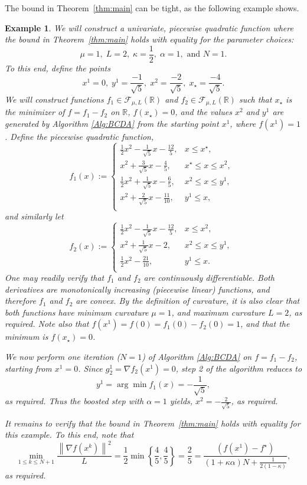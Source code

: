 \documentclass{article} %
\newtheorem{example}{Example}
\newcommand{\R}{{\mathbb R}}
\renewcommand{\leq}{\leqslant}
\begin{document}
{ 
The bound in Theorem~\ref{thm:main} can be tight, as the following example shows.

\begin{example}
\label{ex:tight}
    We will construct a univariate, piecewise quadratic function where the bound in Theorem~\ref{thm:main} holds with equality for the parameter choices:
\[
\mu = 1, \; L = 2, \; \kappa = \frac{1}{2}, \; \alpha = 1, \mbox{ and } N = 1.
\]
To this end, define the points
\[
x^1 = 0, \; y^1 = \frac{-1}{\sqrt{5}}, \;
x^2 = \frac{-2}{\sqrt{5}}, \; x_\star  =\frac{-4}{\sqrt{5}}. 
\]
We will construct functions $f_1 \in\mathcal{F}_{\mu, L}({\mathbb{R}})$ and $f_2 \in \mathcal{F}_{\mu, L}({\mathbb{R}})$ such that $x_\star$ is the minimizer of $f = f_1 - f_2$ on $\R$, $f(x_\star) = 0$, and the values $x^2$ and $y^1$ are generated by Algorithm \ref{Alg:BCDA} from the starting point $x^1$, where $f(x^1) = 1$. 
Define the piecewise quadratic function,
\[
f_1(x):=
\begin{cases}
\frac{1}{2}x^2 - \frac{1}{\sqrt{5}}x - \frac{12}{5}, & x\le x^\star,\\[1mm]
x^2 + \frac{3}{\sqrt{5}}x - \frac{4}{5}, & x^\star\le x\le x^{2},\\[1mm]
\frac{1}{2}x^2 + \frac{1}{\sqrt{5}}x - \frac{6}{5}, & x^{2}\le x\le y^1,\ \ \\[1mm]
x^2 + \frac{2}{\sqrt{5}}x - \frac{11}{10}, & y^1\le x,\ \ \\
\end{cases}
\]
and similarly let
\[
f_2(x):=
\begin{cases}
\frac{1}{2}x^2 - \frac{1}{\sqrt{5}}x - \frac{12}{5}, &  x\le x^{2},\\[1mm]
x^2 + \frac{1}{\sqrt{5}}x - 2, & x^{2}\le x\le y^1,\ \ \\[1mm]
\frac{1}{2}x^2  - \frac{21}{10}, & y^1\le x.\ \ \\
\end{cases}
\]
One may readily verify that $f_1$ and $f_2$ are continuously differentiable. Both derivatives are monotonically increasing (piecewise linear) functions, and therefore $f_1$ and $f_2$ are convex.
By the definition of curvature, it is also clear that both functions have minimum curvature $\mu =1$, and maximum curvature $L=2$, as required. Note also that $f(x^1) = f(0) = f_1(0) - f_2(0) = 1$, and that the minimum is $f(x_\star) = 0$.

We now perform one iteration ($N=1$) of Algorithm \ref{Alg:BCDA} on $f = f_1 - f_2$, starting from $x^1 =0$. Since $g_2^1 = \nabla f_2(x^1) = 0$, step 2 of the algorithm reduces to
\[
y^1 = \arg\min f_1(x) = -\frac{1}{\sqrt{5}},
\]
as required.
Thus the boosted step with $\alpha = 1$ yields, $x^2 = -\frac{2}{\sqrt{5}}$, as required.

It remains to verify that the bound in Theorem~\ref{thm:main} holds with equality for this example. To this end, note that 
\[
\min_{1\leq k\leq N+1}\frac{\left\|\nabla f(x^k)\right\|^2}{L} = \frac{1}{2}\min \left\{\frac{4}{5}, \frac{4}{5}\right\} = \frac{2}{5} = \frac{(f(x^1)-f^\star) }{(1+\kappa\alpha)N + \frac{1}{2(1-\kappa)}},
\]
as required.
\end{example}
}
\end{document}
